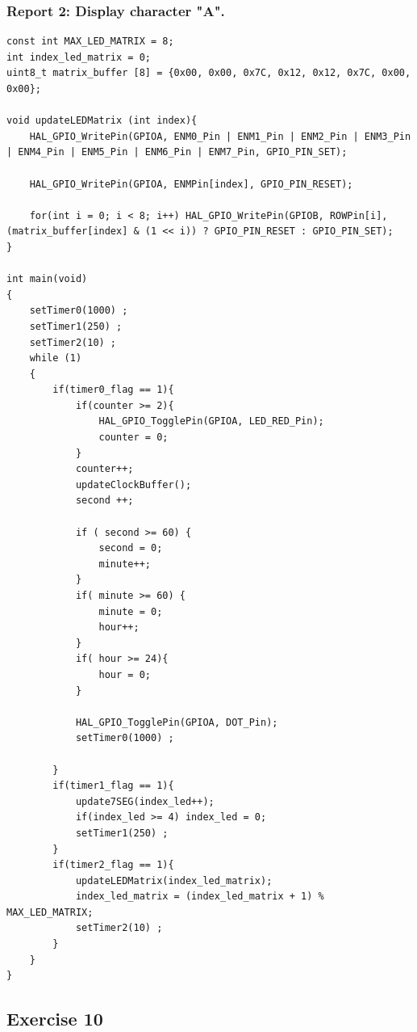 \documentclass[a4paper,12pt]{article}
\begin{document}
\subsubsection{Report 2: Display character "A".}
\begin{lstlisting}
const int MAX_LED_MATRIX = 8;
int index_led_matrix = 0;
uint8_t matrix_buffer [8] = {0x00, 0x00, 0x7C, 0x12, 0x12, 0x7C, 0x00, 0x00};

void updateLEDMatrix (int index){
	HAL_GPIO_WritePin(GPIOA, ENM0_Pin | ENM1_Pin | ENM2_Pin | ENM3_Pin | ENM4_Pin | ENM5_Pin | ENM6_Pin | ENM7_Pin, GPIO_PIN_SET);
	
	HAL_GPIO_WritePin(GPIOA, ENMPin[index], GPIO_PIN_RESET);
	
	for(int i = 0; i < 8; i++) HAL_GPIO_WritePin(GPIOB, ROWPin[i], (matrix_buffer[index] & (1 << i)) ? GPIO_PIN_RESET : GPIO_PIN_SET);
}

int main(void)
{
	setTimer0(1000) ;
	setTimer1(250) ;
	setTimer2(10) ;
	while (1)
	{
		if(timer0_flag == 1){
			if(counter >= 2){
				HAL_GPIO_TogglePin(GPIOA, LED_RED_Pin);
				counter = 0;
			}
			counter++;
			updateClockBuffer();
			second ++;
			
			if ( second >= 60) {
				second = 0;
				minute++;
			}
			if( minute >= 60) {
				minute = 0;
				hour++;
			}
			if( hour >= 24){
				hour = 0;
			}
			
			HAL_GPIO_TogglePin(GPIOA, DOT_Pin);
			setTimer0(1000) ;
			
		}
		if(timer1_flag == 1){
			update7SEG(index_led++);
			if(index_led >= 4) index_led = 0;
			setTimer1(250) ;
		}
		if(timer2_flag == 1){
			updateLEDMatrix(index_led_matrix);
			index_led_matrix = (index_led_matrix + 1) % MAX_LED_MATRIX;
			setTimer2(10) ;
		}
	}
}
\end{lstlisting}
\newpage
\subsection{Exercise 10}
\end{document}
